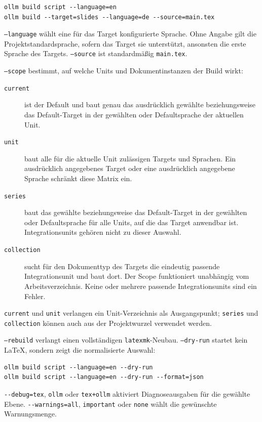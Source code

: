 \documentclass[
load-preamble+
]{osgdoc}
\begin{document}
\begin{verbatim}
ollm build script --language=en
ollm build --target=slides --language=de --source=main.tex
\end{verbatim}

\texttt{--language} wählt eine für das Target konfigurierte Sprache. Ohne
Angabe gilt die Projektstandardsprache, sofern das Target sie unterstützt,
ansonsten die erste Sprache des Targets. \texttt{--source} ist standardmäßig
\texttt{main.tex}.

\texttt{--scope} bestimmt, auf welche Units und Dokumentinstanzen der Build wirkt:

\begin{description}
\item[\texttt{current}] ist der Default und baut genau das ausdrücklich
  gewählte beziehungsweise das Default-Target in der gewählten oder
  Defaultsprache der aktuellen Unit.
\item[\texttt{unit}] baut alle für die aktuelle Unit zulässigen Targets und
  Sprachen. Ein ausdrücklich angegebenes Target oder eine ausdrücklich
  angegebene Sprache schränkt diese Matrix ein.
\item[\texttt{series}] baut das gewählte beziehungsweise das Default-Target in
  der gewählten oder Defaultsprache für alle Units, auf die das Target
  anwendbar ist. Integrationsunits gehören nicht zu dieser Auswahl.
\item[\texttt{collection}] sucht für den Dokumenttyp des Targets die eindeutig
  passende Integrationsunit und baut dort. Der Scope funktioniert unabhängig
  vom Arbeitsverzeichnis. Keine oder mehrere passende Integrationsunits sind
  ein Fehler.
\end{description}

\texttt{current} und \texttt{unit} verlangen ein Unit-Verzeichnis als
Ausgangspunkt; \texttt{series} und \texttt{collection} können auch aus der
Projektwurzel verwendet werden.

\texttt{--rebuild} verlangt einen vollständigen \texttt{latexmk}-Neubau.
\texttt{--dry-run} startet kein LaTeX, sondern zeigt die normalisierte Auswahl:

\begin{verbatim}
ollm build script --language=en --dry-run
ollm build script --language=en --dry-run --format=json
\end{verbatim}

\verb|--debug=tex|, \texttt{ollm} oder \texttt{tex+ollm} aktiviert
Diagnoseausgaben für die gewählte Ebene. \verb|--warnings=all|,
\texttt{important} oder \texttt{none} wählt die gewünschte Warnungsmenge.
\end{document}
